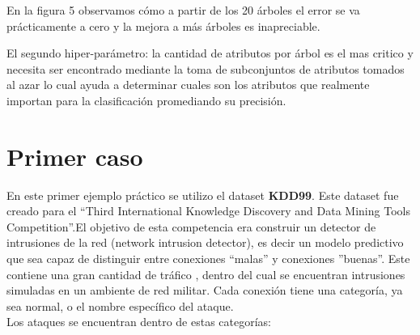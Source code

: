 \documentclass[a4paper,10pt]{article}
\begin{document}
En la figura 5  observamos cómo a partir de los 20 árboles el error se va prácticamente a cero y la mejora a más árboles es inapreciable.

El segundo hiper-parámetro: la cantidad de atributos por árbol es el mas critico y necesita ser encontrado mediante la toma de subconjuntos de atributos tomados al azar lo cual ayuda a determinar cuales son los atributos que realmente importan para la clasificación promediando su precisión. 

\section{Primer caso}
En este primer ejemplo práctico se utilizo el dataset \textbf{KDD99}. Este dataset fue creado para el “Third International Knowledge Discovery and Data Mining Tools Competition”.El objetivo de esta competencia era construir un detector de intrusiones de la red (network intrusion detector), es decir un modelo predictivo que sea capaz de distinguir entre conexiones “malas” y conexiones ”buenas”. Este contiene una gran cantidad de tráfico , dentro del cual se encuentran intrusiones simuladas en un ambiente de red militar.
Cada conexión tiene una categoría, ya sea normal, o el nombre específico del ataque.\\


Los ataques se encuentran dentro de estas categorías:
\end{document}
